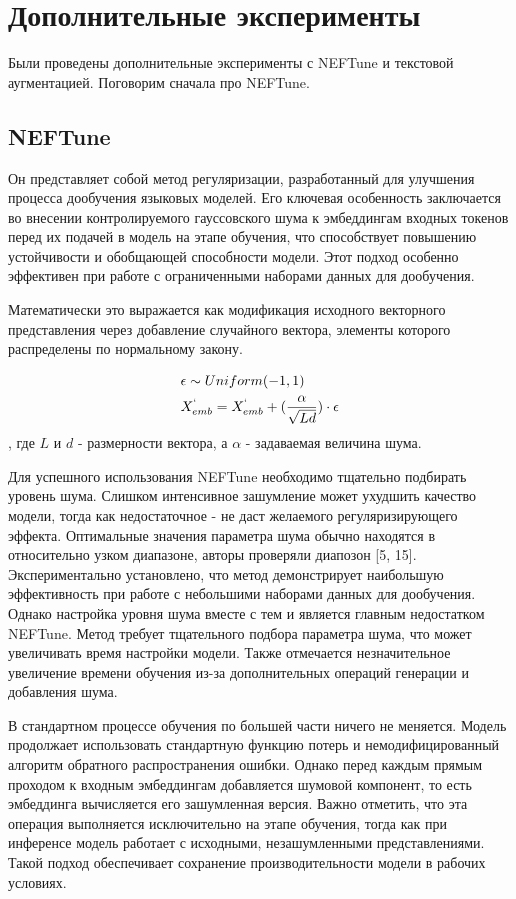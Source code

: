 \section{Дополнительные эксперименты}

Были проведены дополнительные эксперименты с NEFTune и текстовой аугментацией.
Поговорим сначала про NEFTune.

\subsection{NEFTune}
Он представляет собой метод регуляризации, разработанный для улучшения процесса дообучения языковых моделей.
Его ключевая особенность заключается во внесении контролируемого гауссовского шума к эмбеддингам входных токенов перед их подачей в модель на этапе обучения, что способствует повышению устойчивости и обобщающей способности модели.
Этот подход особенно эффективен при работе с ограниченными наборами данных для дообучения.

Математически это выражается как модификация исходного векторного представления через добавление случайного вектора, элементы которого распределены по нормальному закону.

\begin{equation}
  \begin{aligned}
    &\epsilon \sim Uniform(-1, 1) \\
    &X^`_{emb} = X^`_{emb} + (\frac{\alpha}{\sqrt{Ld}})\cdot\epsilon  
  \end{aligned}
  \label{eq:neftune}
\end{equation}
, где $L$ и $d$ - размерности вектора, а $\alpha$ - задаваемая величина шума.

Для успешного использования NEFTune необходимо тщательно подбирать уровень шума.
Слишком интенсивное зашумление может ухудшить качество модели, тогда как недостаточное - не даст желаемого регуляризирующего эффекта.
Оптимальные значения параметра шума обычно находятся в относительно узком диапазоне, авторы проверяли диапозон [5, 15].
Экспериментально установлено, что метод демонстрирует наибольшую эффективность при работе с небольшими наборами данных для дообучения.
Однако настройка уровня шума вместе с тем и является главным недостатком NEFTune.
Метод требует тщательного подбора параметра шума, что может увеличивать время настройки модели.
Также отмечается незначительное увеличение времени обучения из-за дополнительных операций генерации и добавления шума.

В стандартном процессе обучения по большей части ничего не меняется.
Модель продолжает использовать стандартную функцию потерь и немодифицированный алгоритм обратного распространения ошибки.
Однако перед каждым прямым проходом к входным эмбеддингам добавляется шумовой компонент, то есть эмбеддинга вычисляется его зашумленная версия.
Важно отметить, что эта операция выполняется исключительно на этапе обучения, тогда как при инференсе модель работает с исходными, незашумленными представлениями.
Такой подход обеспечивает сохранение производительности модели в рабочих условиях.

